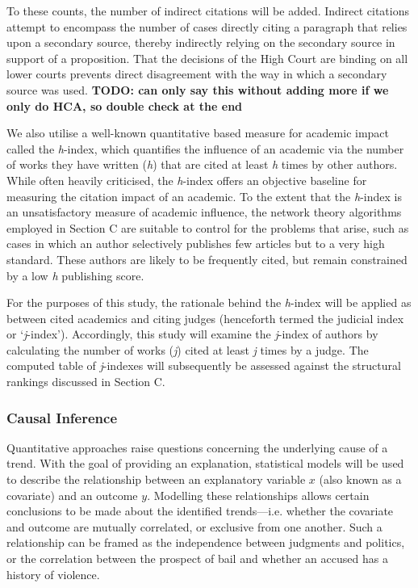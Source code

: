 To these counts, the number of indirect citations will be added. Indirect citations attempt to encompass the number of cases directly citing a paragraph that relies upon a secondary source, thereby indirectly relying on the secondary source in support of a proposition. That the decisions of the High Court are binding on all lower courts prevents direct disagreement with the way in which a secondary source was used.\xn{} \textbf{TODO: can only say this without adding more if we only do HCA, so double check at the end}

We also utilise a well-known quantitative based measure for academic impact called the \emph{h}-index, which quantifies the influence of an academic via the number of works they have written (\emph{h}) that are cited at least \emph{h} times by other authors. While often heavily criticised, the \emph{h}-index offers an objective baseline for measuring the citation impact of an academic. To the extent that the \emph{h}-index is an unsatisfactory measure of academic influence, the network theory algorithms employed in Section C are suitable to control for the problems that arise, such as cases in which an author selectively publishes few articles but to a very high standard. These authors are likely to be frequently cited, but remain constrained by a low \textit{h} publishing score.\xn{}

For the purposes of this study, the rationale behind the \textit{h}-index will be applied as between cited academics and citing judges (henceforth termed the judicial index or `\textit{j}-index'). Accordingly, this study will examine the \emph{j}-index of authors by calculating the number of works (\textit{j}) cited at least \textit{j} times by a judge. The computed table of \emph{j}-indexes will subsequently be assessed against the structural rankings discussed in Section C.

\subsubsection{Causal Inference}
Quantitative approaches raise questions concerning the underlying cause of a trend. With the goal of providing an explanation, statistical models will be used to describe the relationship between an explanatory variable $x$ (also known as a covariate) and an outcome $y$. Modelling these relationships allows certain conclusions to be made about the identified trends---i.e. whether the covariate and outcome are mutually correlated, or exclusive from one another. Such a relationship can be framed as the independence between judgments and politics, or the correlation between the prospect of bail and whether an accused has a history of violence.

